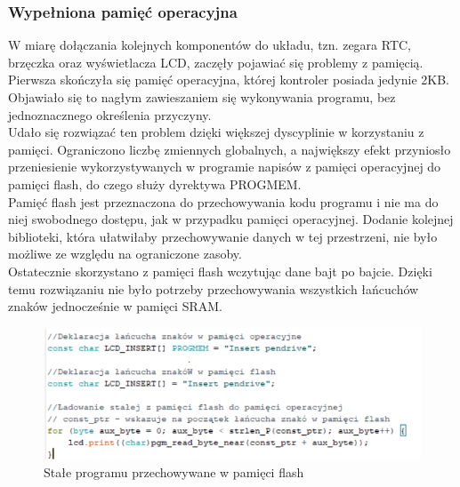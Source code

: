 \documentclass[declaration,shortabstract, mgr]{iithesis}
\begin{document}
\subsubsection{Wypełniona pamięć operacyjna}
\indent W miarę dołączania kolejnych komponentów do układu, tzn. zegara RTC, brzęczka oraz wyświetlacza LCD, zaczęły pojawiać się problemy z pamięcią. \\
\indent Pierwsza skończyła się pamięć operacyjna, której kontroler posiada jedynie 2KB. Objawiało się to nagłym zawieszaniem się wykonywania programu, bez jednoznacznego określenia przyczyny.\\
\indent Udało się rozwiązać ten problem dzięki większej dyscyplinie w korzystaniu z pamięci. Ograniczono liczbę zmiennych globalnych, a największy efekt przyniosło przeniesienie wykorzystywanych w programie napisów z pamięci operacyjnej do pamięci flash, do czego służy dyrektywa PROGMEM.\\
\indent Pamięć flash jest przeznaczona do przechowywania kodu programu i nie ma do niej swobodnego dostępu, jak w przypadku pamięci operacyjnej. Dodanie kolejnej biblioteki, która ułatwiłaby przechowywanie danych w tej przestrzeni, nie było możliwe ze względu na ograniczone zasoby.\\
\indent Ostatecznie skorzystano z pamięci flash wczytując dane bajt po bajcie. Dzięki temu rozwiązaniu nie było potrzeby przechowywania wszystkich łańcuchów znaków jednocześnie w pamięci SRAM.
\begin{figure}[h]
\caption{Stałe programu przechowywane w pamięci flash}
\centering
\includegraphics[scale=0.8]{progmem.png}
\end{figure}
\end{document}
